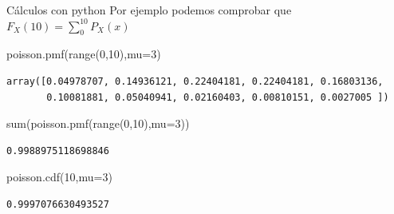 \documentclass[
  ignorenonframetext,
  aspectratio=169]{beamer}
\newenvironment{Shaded}{\begin{snugshade}}{\end{snugshade}}
\newcommand{\BuiltInTok}[1]{\textcolor[rgb]{0.00,0.23,0.31}{#1}}
\newcommand{\DecValTok}[1]{\textcolor[rgb]{0.68,0.00,0.00}{#1}}
\newcommand{\NormalTok}[1]{\textcolor[rgb]{0.00,0.23,0.31}{#1}}
\newcommand{\OperatorTok}[1]{\textcolor[rgb]{0.37,0.37,0.37}{#1}}
\begin{document}
\begin{frame}[fragile]{Cálculos con python}
\protect\hypertarget{cuxe1lculos-con-python-6}{}
Por ejemplo podemos comprobar que
\(F_X(10)=\displaystyle\sum_{0}^{10} P_X(x)\)

\begin{Shaded}
\begin{Highlighting}[]
\NormalTok{poisson.pmf(}\BuiltInTok{range}\NormalTok{(}\DecValTok{0}\NormalTok{,}\DecValTok{10}\NormalTok{),mu}\OperatorTok{=}\DecValTok{3}\NormalTok{)}
\end{Highlighting}
\end{Shaded}

\begin{verbatim}
array([0.04978707, 0.14936121, 0.22404181, 0.22404181, 0.16803136,
       0.10081881, 0.05040941, 0.02160403, 0.00810151, 0.0027005 ])
\end{verbatim}

\begin{Shaded}
\begin{Highlighting}[]
\BuiltInTok{sum}\NormalTok{(poisson.pmf(}\BuiltInTok{range}\NormalTok{(}\DecValTok{0}\NormalTok{,}\DecValTok{10}\NormalTok{),mu}\OperatorTok{=}\DecValTok{3}\NormalTok{))}
\end{Highlighting}
\end{Shaded}

\begin{verbatim}
0.9988975118698846
\end{verbatim}

\begin{Shaded}
\begin{Highlighting}[]
\NormalTok{poisson.cdf(}\DecValTok{10}\NormalTok{,mu}\OperatorTok{=}\DecValTok{3}\NormalTok{)}
\end{Highlighting}
\end{Shaded}

\begin{verbatim}
0.9997076630493527
\end{verbatim}
\end{frame}
\end{document}
